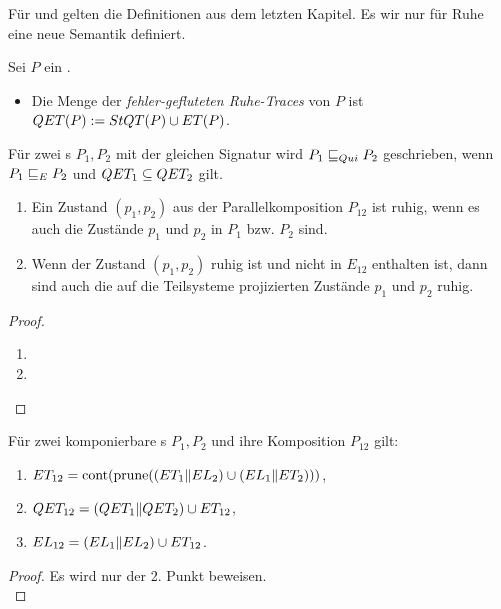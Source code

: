 Für \ET{} und \EL{} gelten die Definitionen aus dem letzten Kapitel. Es wir nur
für Ruhe eine neue Semantik definiert.

\begin{Def}
  Sei $P$ ein \MEIO{}.
  \begin{itemize}
    \item Die Menge der \emph{fehler-gefluteten Ruhe-Traces} von $P$ ist $QET
      (P):= StQT (P)\cup ET (P)$.
  \end{itemize}
  Für zwei \MEIO{}s $P_1,P_2$ mit der gleichen Signatur wird $P_1 \sqsubseteq  _{Qui}{} P_2$
  geschrieben, wenn $P_1 \sqsubseteq  _E{} P_2$ und $QET _1\subseteq QET _2$ gilt.
\end{Def}

\begin{Lem}\mbox{}
  \begin{enumerate}
    \item Ein Zustand $(p_1,p_2)$ aus der Parallelkomposition $P_{12}$ ist
      ruhig, wenn es auch die Zustände $p_1$ und $p_2$ in $P_1$ bzw. $P_2$
      sind.
    \item Wenn der Zustand $(p_1,p_2)$ ruhig ist und nicht in $E_{12}$
      enthalten ist, dann sind auch die auf die Teilsysteme projizierten
      Zustände $p_1$ und $p_2$ ruhig.
  \end{enumerate}
\end{Lem}

\begin{proof}\mbox{}
  \begin{enumerate}
    \item {}
    \item {}
  \end{enumerate}
\end{proof}

\begin{Satz}
  Für zwei komponierbare \MEIO{}s $P_1,P_2$ und ihre Komposition $P_{12}$ gilt:
  \begin{enumerate}
    \item $ET _{12}=\mathrm{cont} (\mathrm{prune} ((ET _1\|EL _2)\cup (EL _1\|ET _2)))$,
    \item $QET _{12}=(QET _1\|QET _2)\cup ET _{12}$,
    \item $EL _{12}=(EL _1\|EL _2)\cup ET _{12}$.
  \end{enumerate}
\end{Satz}

\begin{proof}
  Es wird nur der 2. Punkt beweisen.\\
\end{proof}
